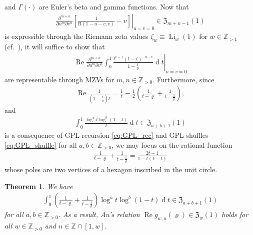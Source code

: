 \documentclass[final,notitlepage,12pt,reqno]{amsart}
\DeclareMathOperator{\Li}{Li}
\DeclareMathOperator{\D}{d}
\DeclareMathOperator{\R}{Re}
\theoremstyle{plain}
\newtheorem{theorem}{Theorem}[section]
\theoremstyle{definition}
\numberwithin{equation}{section}
\begin{document}
and $ \Gamma(\cdot)$ are Euler's beta and gamma functions. Now that\begin{align}
\left.\!\frac{\partial^{m+n}}{\partial u^{m}\partial v^n}\left[ \frac{1 }{\mathrm B(1-u-v,v)} -v\right]\right|_{u=v=0}\in \mathfrak Z_{m+n-1}(1)
\end{align}is expressible through the Riemann zeta values $ \zeta_{w}\equiv\Li_w(1)$ for $ w\in\mathbb Z_{>1}$ (cf.\ \cite[(2.17)]{Xu2017}), it will suffice to show that \begin{align}
\left.\!\R\frac{\partial^{m+n}}{\partial u^{m}\partial v^n}\int_0^1 \frac{t^{v-1} (1-t)^{-u-v}}{1-\frac{t }{\varrho}} \D t\right|_{u=v=0}
\end{align}are representable through MZVs for $ m,n\in\mathbb Z_{>0}$. Furthermore, since\begin{align}
\R\frac{1}{\left(1-\frac{t }{\varrho} \right)t}=\frac{1}{t}-\frac{1}{2}\left( \frac{1}{t-\varrho} +\frac{1}{t-\frac{1}{\varrho}}\right),
\end{align}and\begin{align}
\int_0^1\frac{\log^{a} t \log^{b}(1-t)}{t}\D t\in\mathfrak Z_{a+b+1}(1) 
\end{align}is a consequence of GPL recursion \eqref{eq:GPL_rec}  and GPL shuffles \eqref{eq:GPL_shuffle} for all $a,b\in\mathbb Z_{>0}$, we may focus on the rational function\begin{align}
\frac{1}{t-\varrho} +\frac{1}{t-\frac{1}{\varrho}}=\frac{2t-1}{1-t(1-t)}
\end{align}whose poles are two vertices of a hexagon inscribed in the unit circle.\begin{theorem}\label{thm:1.5b}
We have \begin{align}
\int_0^1\left( \frac{1}{t-\varrho} +\frac{1}{t-\frac{1}{\varrho}} \right)\log^{a} t \log^{b}(1-t)\D t\in\mathfrak Z_{a+b+1}(1)\label{eq:desc3int}
\end{align}for all $a,b\in\mathbb Z_{>0}$. As a result, Au's relation $\R g_{w,n}(\varrho)\in\mathfrak Z_w(1)$ holds for all $ w\in\mathbb Z_{>0}$ and $ n\in\mathbb Z\cap[1,w]$.\end{theorem}
\end{document}
